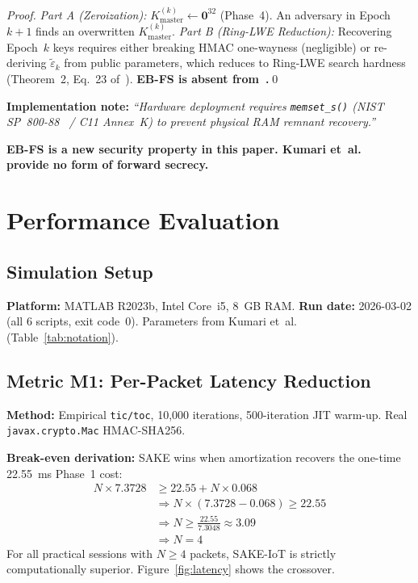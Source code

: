 \documentclass[runningheads]{llncs}
\newcommand{\Kmaster}{K_{\mathrm{master}}}
\begin{document}
\begin{proof}
\textit{Part A (Zeroization):} $\Kmaster^{(k)} \leftarrow \mathbf{0}^{32}$ (Phase~4).
An adversary in Epoch~$k{+}1$ finds an overwritten $\Kmaster^{(k)}$.
\textit{Part B (Ring-LWE Reduction):} Recovering Epoch~$k$ keys requires either
breaking HMAC one-wayness (negligible) or re-deriving $\tilde{\varepsilon}_k$
from public parameters, which reduces to Ring-LWE search hardness
(Theorem~2, Eq.~23 of~\cite{kumari2022}). \textbf{EB-FS is absent from~\cite{kumari2022}.}\qed
\end{proof}

\noindent\textbf{Implementation note:}
\emph{``Hardware deployment requires \texttt{memset\_s()} (NIST SP~800-88~\cite{nist80088}
/ C11 Annex~K) to prevent physical RAM remnant recovery.''}

\noindent\textbf{EB-FS is a new security property in this paper.
Kumari et~al.~\cite{kumari2022} provide no form of forward secrecy.}

\section{Performance Evaluation}
\label{sec:eval}

\subsection{Simulation Setup}

\textbf{Platform:} MATLAB R2023b, Intel Core~i5, 8~GB RAM.
\textbf{Run date:} 2026-03-02 (all 6 scripts, exit code~0).
Parameters from Kumari et~al.~\cite{kumari2022} (Table~\ref{tab:notation}).

\subsection{Metric M1: Per-Packet Latency Reduction}

\textbf{Method:} Empirical \texttt{tic/toc}, 10,000 iterations,
500-iteration JIT warm-up. Real \texttt{javax.crypto.Mac} HMAC-SHA256.

\noindent\textbf{Break-even derivation:} SAKE wins when amortization recovers
the one-time 22.55~ms Phase~1 cost:
\begin{align}
N \times 7.3728 &\geq 22.55 + N \times 0.068 \\
&\Rightarrow N \times (7.3728 - 0.068) \geq 22.55 \\
&\Rightarrow N \geq \frac{22.55}{7.3048} \approx 3.09 \\
&\Rightarrow N = 4
\end{align}
For all practical sessions with $N \geq 4$ packets, SAKE-IoT is strictly
computationally superior. Figure~\ref{fig:latency} shows the crossover.
\end{document}
